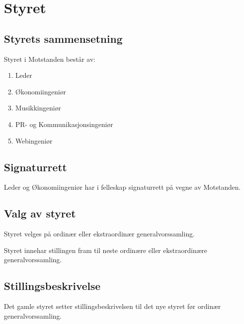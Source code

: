 \section{Styret}
    \subsection{Styrets sammensetning}
        \begin{statute}
            Styret i Motstanden består av:
            \begin{enumerate}[font = \bfseries]
                \item Leder
                \item Økonomiingeniør
                \item Musikkingeniør
                \item PR- og Kommunikasjonsingeniør
                \item Webingeniør
            \end{enumerate}
        \end{statute}
        
    \subsection{Signaturrett}
        \begin{statute}
            Leder og Økonomiingeniør har i felleskap signaturrett på vegne av Motstanden.
        \end{statute}

    \subsection{Valg av styret}
        \begin{statute}
            Styret velges på ordinær eller ekstraordinær generalvorssamling.
        \end{statute}
        \begin{statute}
            Styret innehar stillingen fram til neste ordinære eller ekstraordinære generalvorssamling.
        \end{statute}
        
    \subsection{Stillingsbeskrivelse}
        \begin{statute}
            Det gamle styret setter stillingsbeskrivelsen til det nye styret før ordinær generalvorssamling.
        \end{statute}
      